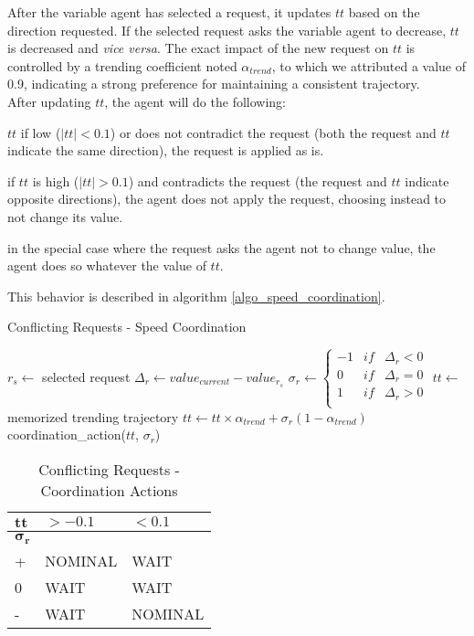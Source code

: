 After the variable agent has selected a request, it updates $tt$ based on the direction requested. If the selected request asks the variable agent to decrease, $tt$ is decreased and \emph{vice versa}. The exact impact of the new request on $tt$ is controlled by a trending coefficient noted $\alpha_{trend}$, to which we attributed a value of 0.9, indicating a strong preference for maintaining a consistent trajectory.\\
After updating $tt$, the agent will do the following:
\begin{compactitem}
\item $tt$ if low ($|tt|< 0.1$) or does not contradict the request (both the request and $tt$ indicate the same direction), the request is applied as is.
\item if $tt$ is high ($|tt|> 0.1$) and contradicts the request (the request and $tt$ indicate opposite directions), the agent does not apply the request, choosing instead to not change its value.
\item in the special case where the request asks the agent not to change value, the agent does so whatever the value of $tt$.
\end{compactitem}
This behavior is described in algorithm \ref{algo_speed_coordination}.

\begin{algorithm}
\caption{Conflicting Requests - Speed Coordination}
\label{algo_speed_coordination}
	$r_s \leftarrow$ selected request\;
	\BlankLine
	$\Delta_r \leftarrow value_{current} - value_{r_{s}}$\;
	$\sigma_r \leftarrow \left\{
 									\begin{array}{rcr}
 									-1 & if &\Delta_r < 0 \\
 									0 & if &\Delta_r = 0\\ 
 									1 & if &\Delta_r > 0 \\
								\end{array}
								\right.$\;
	\BlankLine
	$tt \leftarrow$ memorized trending trajectory\;
	$tt \leftarrow tt \times \alpha_{trend}	+ \sigma_r(1 - \alpha_{trend})$\;
	\BlankLine
	coordination\_action($tt$, $\sigma_r$)	\;
\end{algorithm}

\begin{table}[htbp]
\caption{Conflicting Requests - Coordination Actions}\label{coord_act}
\centering
\begin{tabular}{lll}
		\toprule
		$\boldsymbol{tt}$ & $>-0.1$ & $< 0.1$\\
		\midrule
		$\boldsymbol{\sigma_r}$ &&\\
		+ & NOMINAL & WAIT\\
		0 & WAIT & WAIT\\
		- & WAIT & NOMINAL\\
		\bottomrule
\end{tabular}
\end{table}

